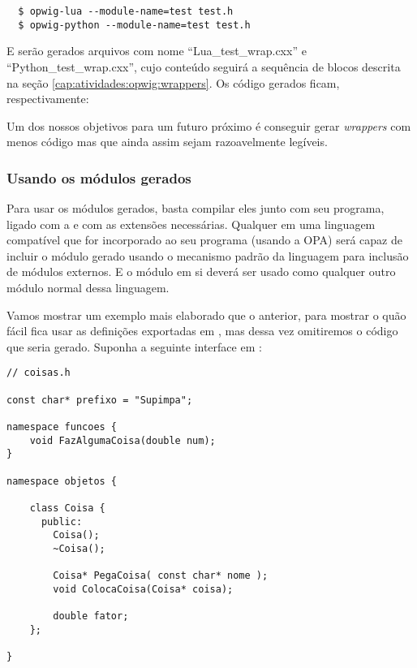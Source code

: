 \begin{verbatim}
  $ opwig-lua --module-name=test test.h
  $ opwig-python --module-name=test test.h
\end{verbatim}

E serão gerados arquivos com nome ``Lua\_test\_wrap.cxx'' e ``Python\_test\_wrap.cxx'',
cujo conteúdo seguirá a sequência de blocos descrita na seção
\ref{cap:atividades:opwig:wrappers}. Os código gerados ficam, respectivamente:

\vspace{1em}

\vspace{1em}

\vspace{1em}

Um dos nossos objetivos para um futuro próximo é conseguir gerar \textit{wrappers}
com menos código mas que ainda assim sejam razoavelmente legíveis.

\subsubsection{Usando os módulos gerados}

Para usar os módulos gerados, basta compilar eles junto com seu programa, ligado com
a  e com as extensões necessárias. Qualquer \script{} em uma
linguagem compatível que for incorporado ao seu programa (usando a OPA) será
capaz de incluir o módulo gerado usando o mecanismo padrão da linguagem para
inclusão de módulos externos. E o módulo em si deverá ser usado como qualquer
outro módulo normal dessa linguagem.

Vamos mostrar um exemplo mais elaborado que o anterior, para mostrar o quão
fácil fica usar as definições exportadas em \script{}, mas dessa vez omitiremos
o código que seria gerado. Suponha a seguinte interface em \CXX{}:

\vspace{1em}
\begin{lstlisting}
// coisas.h

const char* prefixo = "Supimpa";

namespace funcoes {
    void FazAlgumaCoisa(double num);
}

namespace objetos {

    class Coisa {
      public:
        Coisa();
        ~Coisa();
        
        Coisa* PegaCoisa( const char* nome );
        void ColocaCoisa(Coisa* coisa);
        
        double fator;
    };

}
\end{lstlisting}
\vspace{1em}

